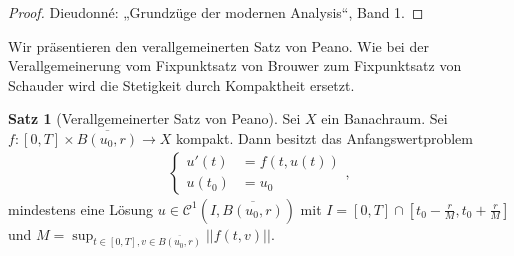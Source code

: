 \documentclass[a4paper]{article}
\theoremstyle{definition}
\newtheorem{theorem}{Satz}
\begin{document}
\begin{proof}
    Dieudonné: „Grundzüge der modernen Analysis“, Band 1.
\end{proof}

Wir präsentieren den verallgemeinerten Satz von Peano. Wie bei der Verallgemeinerung vom Fixpunktsatz von Brouwer zum Fixpunktsatz von Schauder wird die Stetigkeit durch Kompaktheit ersetzt.

\begin{theorem}[Verallgemeinerter Satz von Peano]
    Sei $X$ ein Banachraum. Sei $f: [0,T] \times \overline{B(u_0,r)} \to X$ kompakt. Dann besitzt das Anfangswertproblem
    \begin{align*}
        \begin{cases}
            u'(t)  &= f(t,u(t)) \\
            u(t_0) &= u_0
        \end{cases},
    \end{align*}
    mindestens eine Lösung $u \in \mathcal{C}^1(I, \overline{B(u_0,r)})$ mit $I = [0,T] \cap [t_0 - \frac{r}{M}, t_0 + \frac{r}{M}]$ und $M = \sup_{t \in [0,T], v \in \overline{B(u_0,r)}} ||f(t,v)||$.
\end{theorem}
\end{document}
